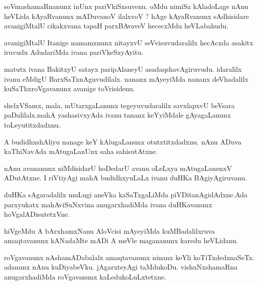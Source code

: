 \documentclass{article}
\begin{document}
\begin{mn}
soVmashamaRnanunx inUnx pariVkiSxsuvenu. oMdu nimiSa kAladoLage nAnu 
heVLida kAyaRvanunx mADuvanoV ilalxvoV ? hAge kAyaRvanunx sAdhisidare 
avanigiMtalU cikakxvana tapaH parxBAvaveV hececxMdu heVLabahudu.
\end{mn}

\begin{mn}
avanigiMtalU Itanige namamxnunx nitayxvU seVvisuvudaralilx hecAcxda
asakitx iruvudu AdudariMda ivana pariVkeSxyAyitu.
\end{mn}

\begin{mn}
matutx ivana BakitxyU satayx paripAlaneyU asadaqshavAgiruvudu. idaralilx 
ivanu eMdigU BarxSaTxnAguvudilalx. nananx mAyeyiMda nananx deVhadalilx 
kuSaThxroVgavanunx avanige toVrisidenu.
\end{mn}

\begin{mn}
shelxVSamx, mala, mUtarxgaLanunx tegeyuvudaralilx savxlapxvU beVsara 
paDalilalx.mahA yashasivxyAda ivanu tananx keYyiMdale gAyagaLanunx toLeyutitxdadxnu.
\end{mn}

\begin{mn}
A budidhxshAliyu nanage keY kAlugaLanunx otutxtitxdadxnu. nAnu ADuva 
kaThiNavAda mAtugaLanUnx saha sahisutAtxne.
\end{mn}

\begin{mn}
nAnu avananunx niMdisidarU hoDedarU avanu oLeLxya mAtugaLanenxV ADutAtxne.
I riVtiyAgi mahA budidhxyuLaLx ivanu duHKa BAgiyAgiruvanu.
\end{mn}

\begin{mn}
duHKa sAgaradalilx muLugi aneVka kaSaTxgaLiMda piVDitanAgidAdxne.Ada parxyukatx
mahAviSuNxvina anugarxhadiMda ivana duHKavanunx hoVgalADisutetxVne.
\end{mn}

\begin{mn}
hiVgeMdu A bArxhamxNanu AloVcisi mAyeyiMda kuMBadalilxruva amaqtavanunx 
kANadaMte mADi A meVle magananunx karedu heVLidanu.
\end{mn}

\begin{mn}
roVgavanunx nAshamADabalalx amaqtavanunx ninanx keYli koTiTxdedxnaSeTx. 
adanunx nAnu kuDiyabeVku. jAgarxteyAgi taMdukoDu. vishuNxshamaRna 
anugarxhadiMda roVgavanunx kaLedukoLuLxtetxne.
\end{mn}
\end{document}
